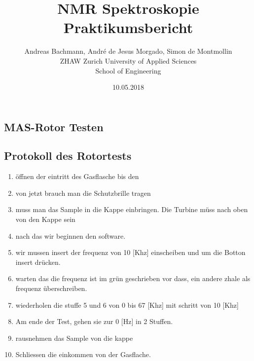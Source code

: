 \documentclass[a4paper]{article}
\title{NMR Spektroskopie Praktikumsbericht}
\author{Andreas Bachmann, André de Jesus Morgado, Simon de Montmollin
	\\
	ZHAW Zurich University of Applied Sciences\\
	School of Engineering
}
\date{10.05.2018}
\begin{document}
	\maketitle
	
	\begin{multicols*}{2}
		
		\section{MAS-Rotor Testen}
			\subsection{Protokoll des Rotortests}
			
				\begin{enumerate}
					\setlength{\itemsep}{0mm}
					\setlength{\parskip}{1mm}
					\item öffnen der eintritt des Gasflasche bis den
					\item von jetzt brauch man die Schutzbrille tragen
					\item muss man das Sample in die Kappe einbringen. Die Turbine müss nach oben von den Kappe sein
					\item nach das wir beginnen den software.
					\item wir mussen insert der frequenz von 10 [Khz] einscheiben und um die Botton insert drücken.
					\item warten das die frequenz ist im grün geschrieben vor dass, ein andere zhale als frequenz überschreiben.
					\item  wiederholen die stuffe 5 und 6 von 0 bis 67 [Khz] mit schritt von 10 [Khz]
					\item Am ende der Test, gehen sie zur 0 [Hz] in 2 Stuffen.
					\item rausnehmen das Sample von die kappe
					\item Schliessen die einkommen von der Gasflache.
				\end{enumerate}
			

\end{multicols*}
\end{document}
